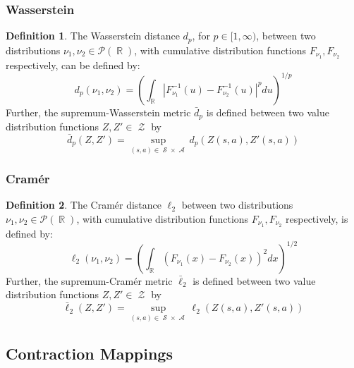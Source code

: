 \documentclass[12pt,a4paper,openright,twoside]{article}
\DeclareMathOperator*{\R}{\mathbb{R}}
\DeclareMathOperator*{\Sspace}{\mathcal{S}}
\DeclareMathOperator*{\A}{\mathcal{A}}
\DeclareMathOperator*{\Z}{\mathcal{Z}}
\numberwithin{equation}{section}
\theoremstyle{definition}
\newtheorem{definition}{Definition}
\theoremstyle{remark}
\theoremstyle{plain}
\begin{document}
\subsubsection{Wasserstein}

\begin{definition}
	The Wasserstein distance $d_p$, for $p\in [1,\infty)$, between two distributions $\nu_1, \nu_2 \in \mathscr{P}(\R)$, with cumulative distribution functions $F_{\nu_1}, F_{\nu_2}$ respectively, can be defined by:
	\begin{equation*}
		d_p(\nu_1,\nu_2) = \left( \int_{\R} | F_{\nu_1}^{-1}(u) - F_{\nu_2}^{-1}(u)|^p du \right) ^{1/p}
	\end{equation*}
	Further, the supremum-Wasserstein metric $\bar{d}_p$ is defined between two value distribution functions $Z, Z' \in \Z$ by
	\begin{equation*}
		\bar{d}_p(Z,Z') = \sup_{(s,a) \in \Sspace \times \A} d_p(Z(s,a), Z'(s,a))
	\end{equation*}
\end{definition}


\subsubsection{Cramér}

\begin{definition}
	The Cramér distance $\ell_2$ between two distributions $\nu_1, \nu_2 \in \mathscr{P}(\R)$, with cumulative distribution functions $F_{\nu_1}, F_{\nu_2}$ respectively, is defined by:
	\begin{equation*}
		\ell_2(\nu_1,\nu_2) = \left( \int_{\R} (F_{\nu_1}(x) - F_{\nu_2}(x))^2dx \right) ^{1/2}
	\end{equation*}
	Further, the supremum-Cramér metric $\bar{\ell}_2$ is defined between two value distribution functions $Z, Z' \in \Z$ by
	\begin{equation*}
		\bar{\ell}_2(Z,Z') = \sup_{(s,a) \in \Sspace \times \A} \ell_2(Z(s,a), Z'(s,a))
	\end{equation*}
\end{definition}







\subsection{Contraction Mappings} \label{contractionTheory}
\end{document}

